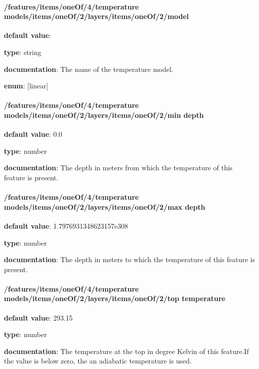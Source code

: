 \paragraph{/features/items/oneOf/4/temperature models/items/oneOf/2/layers/items/oneOf/2/model} \begin{itemized}
\item {\bf default value}: 
\item {\bf type}: string
\item {\bf documentation}: The name of the temperature model.
\item {\bf enum}: [linear]\end{itemized}\paragraph{/features/items/oneOf/4/temperature models/items/oneOf/2/layers/items/oneOf/2/min depth} \begin{itemized}
\item {\bf default value}: 0.0
\item {\bf type}: number
\item {\bf documentation}: The depth in meters from which the temperature of this feature is present.
\end{itemized}\paragraph{/features/items/oneOf/4/temperature models/items/oneOf/2/layers/items/oneOf/2/max depth} \begin{itemized}
\item {\bf default value}: 1.7976931348623157e308
\item {\bf type}: number
\item {\bf documentation}: The depth in meters to which the temperature of this feature is present.
\end{itemized}\paragraph{/features/items/oneOf/4/temperature models/items/oneOf/2/layers/items/oneOf/2/top temperature} \begin{itemized}
\item {\bf default value}: 293.15
\item {\bf type}: number
\item {\bf documentation}: The temperature at the top in degree Kelvin of this feature.If the value is below zero, the an adiabatic temperature is used.

\end{itemized}
